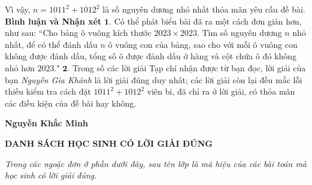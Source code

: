 \begin{multicols}{2}
	\vskip 0.05cm
	Vì vậy, $n = 1011^2 + 1012^2$ là số nguyên dương nhỏ nhất thỏa mãn yêu cầu đề bài.
	\vskip 0.05cm
	\textbf{\color{thachthuctoanhoc}Bình luận và Nhận xét}
	\vskip 0.05cm
	$\pmb{1.}$ Có thể phát biểu bài đã ra một cách đơn giản hơn, như sau:
	\vskip 0.05cm
	``Cho bảng ô vuông kích thước $2023 \times 2023$. Tìm số nguyên dương $n$ nhỏ nhất, để có thể đánh dấu $n$ ô vuông con của bảng, sao cho với mỗi ô vuông con không được đánh dấu, tổng số ô được đánh dấu ở hàng và cột chứa ô đó không nhỏ hơn $2023$."
	\vskip 0.05cm
	$\pmb{2.}$ Trong số các lời giải Tạp chí nhận được từ bạn đọc, lời giải của bạn \textit{Nguyễn Gia Khánh} là lời giải đúng duy nhất; các lời giải còn lại đều mắc lỗi thiếu kiểm tra cách đặt $1011^2 + 1012^2$ viên bi, đã chỉ ra ở lời giải, có thỏa mãn các điều kiện của đề bài hay không.
	\begin{flushright}
		\textbf{\color{thachthuctoanhoc}Nguyễn Khắc Minh}
	\end{flushright}
\end{multicols}
\newpage
\begin{center}
	\textbf{\color{thachthuctoanhoc}DANH SÁCH HỌC SINH CÓ LỜI GIẢI ĐÚNG}
\end{center}
\textit{Trong các ngoặc đơn ở phần dưới đây, sau tên lớp là mã hiệu của các bài toán mà học sinh có lời giải đúng.}
